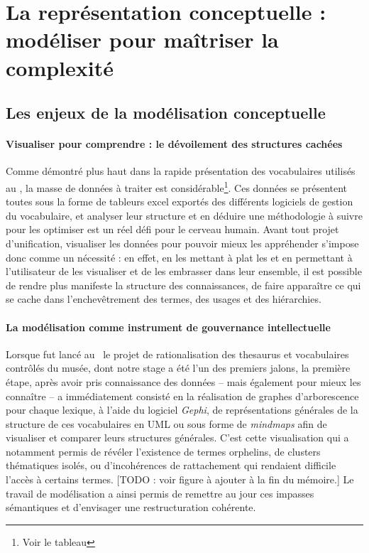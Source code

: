 \section{\label{III-A-1}La représentation conceptuelle : modéliser pour maîtriser la complexité}

\subsection{Les enjeux de la modélisation conceptuelle}

\paragraph*{Visualiser pour comprendre : le dévoilement des structures cachées}
Comme démontré plus haut dans la rapide présentation des vocabulaires utilisés au \mae, la masse de données à traiter est considérable\footnote{Voir le tableau }. Ces données se présentent toutes sous la forme de tableurs excel exportés des différents logiciels de gestion du vocabulaire, et analyser leur structure et en déduire une méthodologie à suivre pour les optimiser est un réel défi pour le cerveau humain. Avant tout projet d'unification, visualiser les données pour pouvoir mieux les appréhender s’impose donc comme un nécessité : en effet, en les mettant à plat les et en permettant à l'utilisateur de les visualiser et de les embrasser dans leur ensemble, il est possible de rendre plus manifeste la structure des connaissances, de faire apparaître ce qui se cache dans l’enchevêtrement des termes, des usages et des hiérarchies.

\paragraph*{La modélisation comme instrument de gouvernance intellectuelle}
Lorsque fut lancé au \mae~le projet de rationalisation des \gls{thesaurus} et vocabulaires contrôlés du musée, dont notre stage a été l'un des premiers jalons, la première étape, après avoir pris connaissance des données -- mais également pour mieux les connaître -- a immédiatement consisté en la réalisation de graphes d’arborescence pour chaque lexique, à l’aide du logiciel \textit{Gephi}, de représentations générales de la structure de ces vocabulaires en UML ou sous forme de \textit{mindmaps} afin de visualiser et comparer leurs structures générales. C'est cette visualisation qui a notamment permis de révéler l’existence de termes orphelins, de clusters thématiques isolés, ou d’incohérences de rattachement qui rendaient difficile l'accès à certains termes. [TODO : voir figure à ajouter à la fin du mémoire.] Le travail de modélisation a ainsi permis de remettre au jour ces impasses sémantiques et d’envisager une restructuration cohérente.

